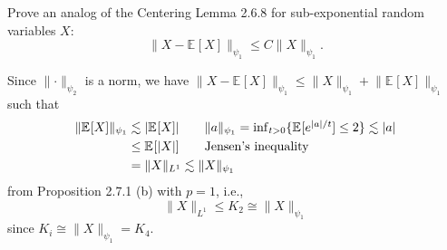 \begin{problem*}[Exercise 2.7.10]\label{ex2.7.10}
	Prove an analog of the Centering Lemma 2.6.8 for sub-exponential random variables \(X\):
	\[
		\lVert X - \mathbb{E}_{}[X] \rVert _{\psi _1}
		\leq C \lVert X \rVert _{\psi _1}.
	\]
\end{problem*}
\begin{answer}
	Since \(\lVert \cdot \rVert _{\psi _2}\) is a norm, we have \(\lVert X - \mathbb{E}_{}[X] \rVert _{\psi _1} \leq \lVert X \rVert _{\psi _1} + \lVert \mathbb{E}_{}[X] \rVert _{\psi _1}\) such that
	\begin{align*}
		\lVert \mathbb{E}_{}[X] \rVert _{\psi _1}
		 & \lesssim \vert \mathbb{E}_{}[X] \vert \tag*{\(\lVert a \rVert _{\psi _1} = \inf _{t > 0} \{ \mathbb{E}_{}[e^{\vert a \vert / t}] \leq 2 \} \lesssim \vert a \vert \)} \\
		 & \leq \mathbb{E}_{}[\vert X \vert ]    \tag*{Jensen's inequality}                                                                                                      \\
		 & = \lVert X \rVert _{L^1}
		\lesssim \lVert X \rVert _{\psi _1}
	\end{align*}
	from Proposition 2.7.1 (b) with \(p = 1\), i.e.,
	\[
		\lVert X \rVert _{L^1} \leq K_{2} \cong \lVert X \rVert _{\psi _1}
	\]
	since \(K_i \cong \lVert X \rVert _{\psi _1} = K_4\).
\end{answer}